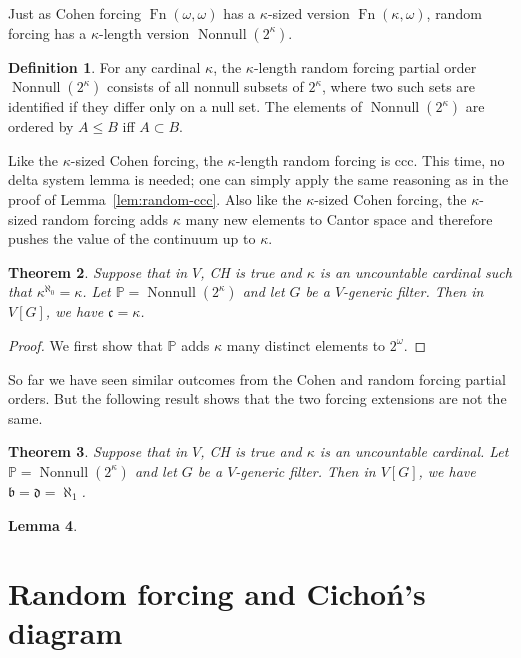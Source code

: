 \documentclass[11pt,oneside]{amsbook}
\newcommand{\PP}{\mathbb P}
\DeclareMathOperator{\Fn}{Fn}
\DeclareMathOperator{\Nonnull}{Nonnull}
\theoremstyle{definition}
\theoremstyle{plain}
\newtheorem{thm}{Theorem}[section]
\newtheorem{lem}[thm]{Lemma}
\theoremstyle{definition}
\newtheorem{defn}[thm]{Definition}
\theoremstyle{remark}
\begin{document}

Just as Cohen forcing $\Fn(\omega,\omega)$ has a $\kappa$-sized version $\Fn(\kappa,\omega)$, random forcing has a $\kappa$-length version $\Nonnull(2^\kappa)$.

\begin{defn}
  For any cardinal $\kappa$, the $\kappa$-length random forcing partial order $\Nonnull(2^\kappa)$ consists of all nonnull subsets of $2^\kappa$, where two such sets are identified if they differ only on a null set. The elements of $\Nonnull(2^\kappa)$ are ordered by $A\leq B$ iff $A\subset B$.
\end{defn}

Like the $\kappa$-sized Cohen forcing, the $\kappa$-length random forcing is ccc. This time, no delta system lemma is needed; one can simply apply the same reasoning as in the proof of Lemma~\ref{lem:random-ccc}. Also like the $\kappa$-sized Cohen forcing, the $\kappa$-sized random forcing adds $\kappa$ many new elements to Cantor space and therefore pushes the value of the continuum up to $\kappa$.

\begin{thm}
  Suppose that in $V$, CH is true and $\kappa$ is an uncountable cardinal such that $\kappa^{\aleph_0}=\kappa$. Let $\PP=\Nonnull(2^\kappa)$ and let $G$ be a $V$-generic filter. Then in $V[G]$, we have $\mathfrak c=\kappa$.
\end{thm}

\begin{proof}
  We first show that $\PP$ adds $\kappa$ many distinct elements to $2^\omega$.
\end{proof}

So far we have seen similar outcomes from the Cohen and random forcing partial orders. But the following result shows that the two forcing extensions are not the same.

\begin{thm}
  Suppose that in $V$, CH is true and $\kappa$ is an uncountable cardinal. Let $\PP=\Nonnull(2^\kappa)$ and let $G$ be a $V$-generic filter. Then in $V[G]$, we have $\mathfrak b=\mathfrak d=\aleph_1$.
\end{thm}

\begin{lem}

\end{lem}

\section{Random forcing and Cicho\'n's diagram}
\end{document}
